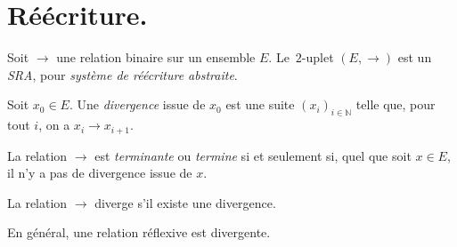 \documentclass[../main]{subfiles}
\begin{document}
  \chapter{Réécriture.}
  \minitoc

  \begin{defn}
    Soit $\to$ une relation binaire sur un ensemble $E$. Le~$2$-uplet $(E, \to)$ est un \textit{SRA}, pour \textit{système de réécriture abstraite}.

    Soit $x_0 \in E$. Une \textit{divergence} issue de $x_0$ est une suite $(x_i)_{i \in \mathds{N}}$ telle que, pour tout $i$, on a $x_i \to x_{i+1}$.

    La relation $\to$ est \textit{terminante} ou \textit{termine} si et seulement si, quel que soit $x \in E$, il n'y a pas de divergence issue de $x$.

    La relation $\to$ diverge s'il existe une divergence.
  \end{defn}

  \begin{exm}
    En général, une relation réflexive est divergente.
  \end{exm}
\end{document}
